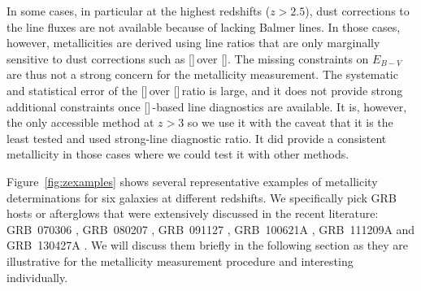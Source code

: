 \documentclass[traditabstract, longauth]{aa}
\newcommand{\oii}{[\ion{O}{ii}]}
\newcommand{\neiii}{[\ion{Ne}{iii}]}
\newcommand{\nii}{[\ion{N}{ii}]}
\begin{document}
\begin{appendix}
In some cases, in particular at the highest redshifts ($z>2.5$), dust corrections to the line fluxes are not available because of lacking Balmer lines. In those cases, however, metallicities are derived using line ratios that are only marginally sensitive to dust corrections such as \neiii\,over \oii. The missing constraints on $E_{B-V}$ are thus not a strong concern for the metallicity measurement. The systematic and statistical error of the \neiii\,over \oii\,ratio is large, and it does not provide strong additional constraints once \nii\,-based line diagnostics are available. It is, however, the only accessible method at $z>3$ so we use it with the caveat that it is the least tested and used strong-line diagnostic ratio. It did provide a consistent metallicity in those cases where we could test it with other methods.

Figure~\ref{fig:zexamples} shows several representative examples of metallicity determinations for six galaxies at different redshifts. We specifically pick GRB hosts or afterglows that were extensively discussed in the recent literature: GRB~070306 \citep{2008ApJ...681..453J, 2011A&A...534A.108K}, GRB~080207 \citep{2011ApJ...736L..36H, 2012MNRAS.421...25S}, GRB~091127 \citep{2011A&A...535A.127V}, GRB~100621A \citep{2013A&A...560A..70G}, GRB~111209A \citep{2013ApJ...766...30G, 2014ApJ...781...13L, 2015Greinersubm, 2015Kannsubm} and GRB~130427A \citep[e.g.,][]{2013ApJ...776...98X, 2014ApJ...781...37P}. We will discuss them briefly in the following section as they are illustrative for the metallicity measurement procedure and interesting individually.


\end{appendix}
\end{document}

